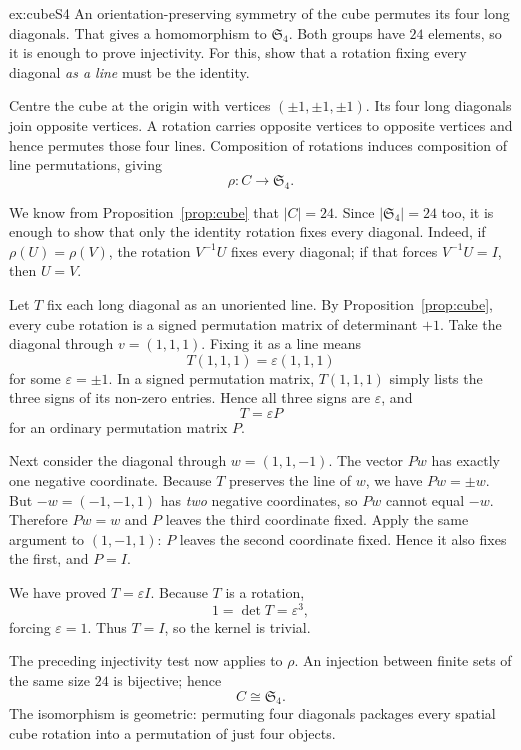 \begin{solution}{ex:cubeS4}
\idea An orientation-preserving symmetry of the cube permutes its four long diagonals. That gives a homomorphism to $\mathfrak S_4$. Both groups have $24$ elements, so it is enough to prove injectivity. For this, show that a rotation fixing every diagonal \emph{as a line} must be the identity.

\writeup Centre the cube at the origin with vertices $(\pm1,\pm1,\pm1)$. Its four long diagonals join opposite vertices. A rotation carries opposite vertices to opposite vertices and hence permutes those four lines. Composition of rotations induces composition of line permutations, giving
\[
\rho:C\longrightarrow\mathfrak S_4.
\]

We know from Proposition~\ref{prop:cube} that $|C|=24$. Since $|\mathfrak S_4|=24$ too, it is enough to show that only the identity rotation fixes every diagonal. Indeed, if $\rho(U)=\rho(V)$, the rotation $V^{-1}U$ fixes every diagonal; if that forces $V^{-1}U=I$, then $U=V$.

Let $T$ fix each long diagonal as an unoriented line. By Proposition~\ref{prop:cube}, every cube rotation is a signed permutation matrix of determinant $+1$. Take the diagonal through $v=(1,1,1)$. Fixing it as a line means
\[
T(1,1,1)=\varepsilon(1,1,1)
\]
for some $\varepsilon=\pm1$. In a signed permutation matrix, $T(1,1,1)$ simply lists the three signs of its non-zero entries. Hence all three signs are $\varepsilon$, and
\[
T=\varepsilon P
\]
for an ordinary permutation matrix $P$.

Next consider the diagonal through $w=(1,1,-1)$. The vector $Pw$ has exactly one negative coordinate. Because $T$ preserves the line of $w$, we have $Pw=\pm w$. But $-w=(-1,-1,1)$ has \emph{two} negative coordinates, so $Pw$ cannot equal $-w$. Therefore $Pw=w$ and $P$ leaves the third coordinate fixed. Apply the same argument to $(1,-1,1)$: $P$ leaves the second coordinate fixed. Hence it also fixes the first, and $P=I$.

We have proved $T=\varepsilon I$. Because $T$ is a rotation,
\[
1=\det T=\varepsilon^3,
\]
forcing $\varepsilon=1$. Thus $T=I$, so the kernel is trivial.

The preceding injectivity test now applies to $\rho$. An injection between finite sets of the same size $24$ is bijective; hence
\[
\boxed{C\cong\mathfrak S_4}.
\]
The isomorphism is geometric: permuting four diagonals packages every spatial cube rotation into a permutation of just four objects.
\end{solution}

